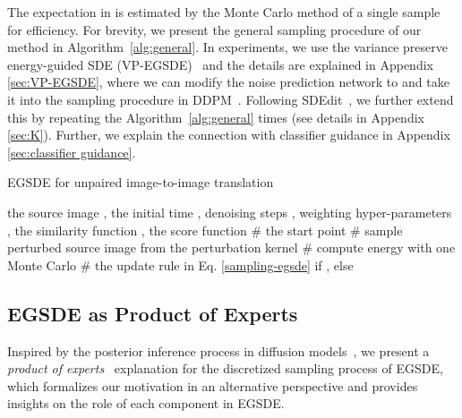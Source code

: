 \documentclass{article}
\begin{document}
The expectation in  is estimated by the Monte Carlo method of a single sample for efficiency. 
For brevity, we present the general sampling procedure of our method in Algorithm~{\ref{alg:general}}. In experiments, we use the variance preserve energy-guided SDE (VP-EGSDE)~\cite{song2020score,ho2020denoising} and the details are explained in Appendix \ref{sec:VP-EGSDE}, where we can modify the noise prediction network to  and take it into the sampling procedure in DDPM~\cite{ho2020denoising}. Following SDEdit~\cite{meng2021sdedit}, we further extend this by repeating the Algorithm~{\ref{alg:general}}  times (see details in Appendix \ref{sec:K}). Further, we explain the connection with classifier guidance\cite{dhariwal2021diffusion} in Appendix \ref{sec:classifier guidance}.


\begin{algorithm}
    \caption{EGSDE for unpaired image-to-image translation}
    \label{alg:general}
    \begin{algorithmic}
        \REQUIRE the source image , the initial time , denoising steps , weighting hyper-parameters , the similarity function , the score function  
        \STATE  \# the start point
        \STATE 
        \STATE 
        \STATE  \# sample perturbed source image from the perturbation kernel
        \STATE  \# compute energy with one Monte Carlo
        \STATE  \# the update rule in Eq. \eqref{sampling-egsde}
        \STATE  if , else 
        \STATE 
    \ENDFOR
    \STATE 
    \RETURN 
    \end{algorithmic}
\end{algorithm}






\subsection{EGSDE as Product of Experts}
\label{sec:products as experts}



















Inspired by the posterior inference process in diffusion models~\cite{sohl2015deep}, 
we present a  \emph{product of experts}~\cite{hinton2002training} explanation for the discretized sampling process of EGSDE, which formalizes our motivation in an alternative perspective and provides insights on the role of each component in EGSDE. 
\end{document}

